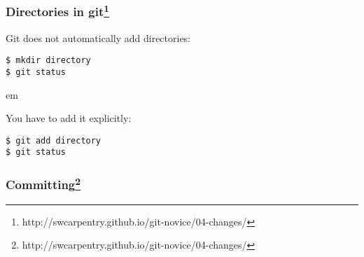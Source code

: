 \documentclass{beamer}
\begin{document}
\begin{frame}[fragile]
  \frametitle{Directories in git\footnote{http://swcarpentry.github.io/git-novice/04-changes/}}

Git does not automatically add directories:
\begin{verbatim}
$ mkdir directory
$ git status
\end{verbatim}
\pause
{} em

You have to add it explicitly:
\begin{verbatim}
$ git add directory
$ git status
\end{verbatim}

\end{frame}

\begin{frame}
  \frametitle{Committing\footnote{http://swcarpentry.github.io/git-novice/04-changes/}}


\end{frame}
\end{document}
